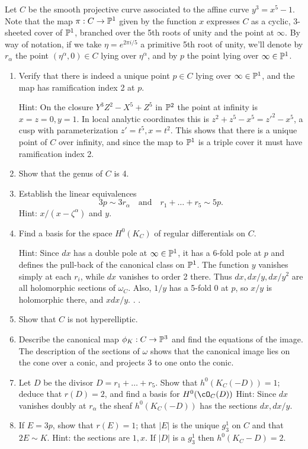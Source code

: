 \begin{exercise}
Let $C$ be the smooth projective curve associated to the affine curve 
$y^3 = x^5 -1$. 
Note that the map $\pi : C \to \PP^1$ given by the function $x$ expresses $C$ as a cyclic, 3-sheeted cover of $\PP^1$, branched over the 5th roots of unity and the point at $\infty$. By way of notation, if we take $\eta = e^{2\pi i/5}$ a primitive 5th root of unity, we'll denote by $r_\alpha$ the point $(\eta^\alpha, 0) \in C$ lying over $\eta^\alpha$, and by $p$ the point lying over $\infty \in \PP^1$.

\begin{enumerate}
\item Verify that there is indeed a unique point $p \in C$ lying over $\infty \in \PP^1$, and the map has ramification index 2 at $p$. 

Hint: On the closure  $Y^3Z^2-X^5+Z^5$ in $\PP^2$ the point at infinity is $x=z=0, y=1$. In local analytic coordinates this is
$z^2+z^5-x^5 = z'^2-x^5$, a cusp with parameterization $z'=t^5, x= t^2$. This shows that there is a unique point of $C$
over infinity, and since the map to $\PP^1$ is a triple cover it must have ramification index 2. 

\item Show that the genus of $C$ is 4.

\item Establish the linear equivalences
$$
3p \sim 3r_\alpha \quad \text{and} \quad r_1+ \dots + r_5 \sim 5p. 
$$
Hint: $x/(x-\zeta^\alpha)$ and $y$.
\item Find a basis for the space $H^0(K_C)$ of regular differentials on $C$.

Hint: Since
$dx$ has a double pole at $\infty \in \PP^1$, it has a 6-fold pole at $p$ and defines the pull-back of the canonical
class on $\PP^1$. The function $y$ vanishes simply
at each $r_i$, while $dx$ vanishes to order 2 there. Thus $dx, dx/y, dx/y^2$ are all holomorphic sections of $\omega_C$.
Also, $1/y$ has a 5-fold 0 at $p$, so $x/y$ is holomorphic there, and $x dx/y$. . .

\item Show that $C$ is not hyperelliptic.
\item Describe the canonical map $\phi_K : C \to \PP^3$ and find the equations of the image.
The description of the sections of $\omega$  shows that the canonical image lies on the cone over a conic,
and projects 3 to one onto the conic.
\item Let $D$ be the divisor $D = r_1+\dots+r_5$. Show that $h^0(K_C(-D)) = 1$; deduce that $r(D) = 2$, and find a basis for $H^0(\cO_C(D))$
Hint:  Since $dx$ vanishes doubly at $r_\alpha$ the sheaf $h^0(K_C(-D))$ has the sections $dx, dx/y$.

\item If $E = 3p$, show that $r(E) = 1$; that $|E|$ is the unique $g^1_3$ on $C$ and that $2E \sim K$.
Hint: the sections are $1,x$. If $|D|$ is a  $g^1_3$ then $h^0(K_C-D) = 2$.
\end{enumerate}
\end{exercise}


